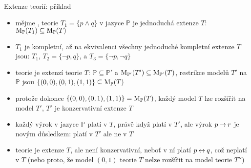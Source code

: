 \documentclass{beamer}
\begin{document}
\begin{frame}{Extenze teorií: příklad}

    \small
    \begin{itemize}
        \item mějme , teorie $T_1=\{p\land q\}$ v jazyce $\mathbb P$ \alert{je jednoduchá} extenze $T$: $\operatorname{M}_\mathbb P(T_1)\subseteq\operatorname{M}_\mathbb P(T)$
        \item $T_1$ je kompletní, až na ekvivalenci všechny jednoduché kompletní extenze $T$ jsou: $T_1$, $T_2=\{\neg p,q\}$, a $T_3=\{\neg p,\neg q\}$
        \item teorie  je extenzí teorie $T$: $\mathbb P\subseteq\mathbb P'$ a $\operatorname{M}_{\mathbb P'}(T')\subseteq\operatorname{M}_{\mathbb P'}(T)$, restrikce modelů $T'$ na $\mathbb P$ jsou $\{(0,0),(0,1),(1,1)\}\subseteq\operatorname{M}_\mathbb P(T)$
        
        \item protože dokonce $\{(0,0),(0,1),(1,1)\}=\operatorname{M}_\mathbb P(T)$, každý model $T$ lze rozšířit na model $T'$, $T'$ \alert{je konzervativní} extenze $T$
        \item každý výrok v jazyce $\mathbb P$ platí v $T$, právě když platí v $T'$, ale výrok $p\mathbin{\rightarrow} r$ je novým důsledkem: platí v $T'$ ale ne v $T$
        \item teorie  je extenze $T$, ale \alert{není konzervativní}, neboť v ní platí $p\mathbin{\leftrightarrow} q$, což neplatí v $T$ (nebo proto, že model $(0, 1)$ teorie $T$ nelze rozšířit na model teorie $T''$)
    \end{itemize}
 
\end{frame}
\end{document}
